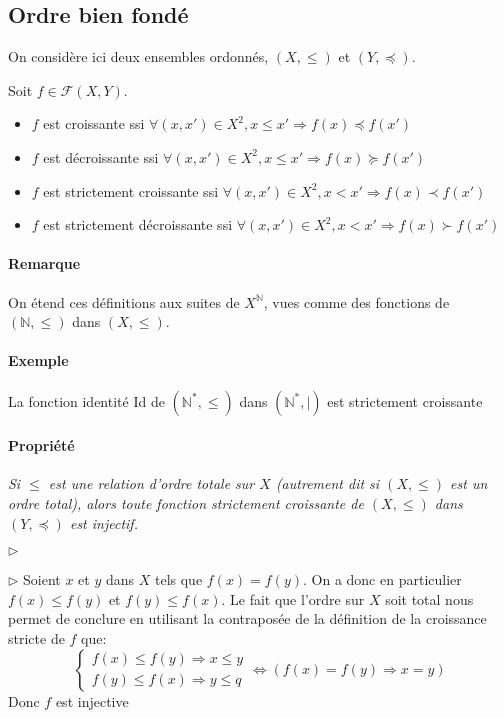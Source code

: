 \documentclass{scrartcl}
\begin{document}
		\subsection{Ordre bien fondé}
			On considère ici deux ensembles ordonnés, $(X,\leq)$ et $(Y,\preceq)$.

			Soit $f \in \mathcal{F}(X,Y)$. 
			\begin{itemize}
				\item $f$ est croissante ssi $\forall (x,x') \in X^2, x \leq x' \Rightarrow f(x) \preceq f(x')$
				\item $f$ est décroissante ssi $\forall (x,x') \in X^2, x \leq x' \Rightarrow f(x) \succeq f(x')$
				\item $f$ est strictement croissante ssi $\forall (x,x') \in X^2, x < x' \Rightarrow f(x) \prec f(x')$
				\item $f$ est strictement décroissante ssi $\forall (x,x') \in X^2, x < x' \Rightarrow f(x) \succ f(x')$
			\end{itemize}

			\paragraph{Remarque} On étend ces définitions aux suites de $X^\mathbb{N}$, 
			vues comme des fonctions de $(\mathbb{N},\leq)$ dans $(X,\leq)$.

			\paragraph{Exemple} La fonction identité Id de $(\mathbb{N}^*,\leq)$ dans $(\mathbb{N}^*,|)$ est strictement croissante
			
			\paragraph{Propriété} \textsl{Si $\leq$ est une relation d'ordre totale sur $X$ (autrement dit si $(X,\leq)$ est un ordre total),
				alors toute fonction strictement croissante de $(X,\leq)$ dans $(Y,\preceq)$ est injectif.}
			\begin{labeling}{$\triangleright$}
				\item [$\triangleright$] Soient $x$ et $y$ dans $X$ tels que $f(x) = f(y)$.
				On a donc en particulier $f(x) \leq f(y)$ et $f(y) \leq f(x)$. 
				Le fait que l'ordre sur $X$ soit total nous permet de conclure
				en utilisant la contraposée de la définition de la croissance stricte de $f$ que:
				\[
					\begin{cases}
						f(x) \leq f(y) \Rightarrow x \leq y \\
						f(y) \leq f(x) \Rightarrow y \leq q
					\end{cases}
					\Leftrightarrow \left(f(x) = f(y) \Rightarrow x=y \right)
				\]
				Donc $f$ est injective
			\end{labeling}
\end{document}
